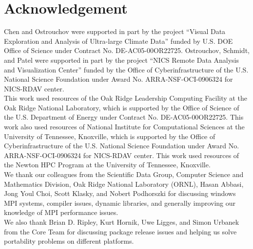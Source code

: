 
\section*{Acknowledgement}

Chen and Ostrouchov were supported in part by the project
``Visual Data Exploration and Analysis of Ultra-large Climate Data''
funded by U.S. DOE Office of Science
under Contract No. DE-AC05-00OR22725.
Ostrouchov, Schmidt, and Patel were supported in part by the project
``NICS Remote Data Analysis and Visualization Center''
funded by the Office of Cyberinfrastructure of the
U.S. National Science Foundation
under Award No. ARRA-NSF-OCI-0906324 for NICS-RDAV center.
\\

This work used resources of the Oak Ridge Leadership Computing Facility at the
Oak Ridge National Laboratory, which is supported by the Office of Science
of the U.S. Department of Energy under Contract No. DE-AC05-00OR22725.
This work also used resources of National Institute for Computational
Sciences at the University of Tennessee, Knoxville, which is supported
by the Office of Cyberinfrastructure of the U.S. National Science Foundation
under Award No. ARRA-NSF-OCI-0906324 for NICS-RDAV center.
This work used resources of the Newton HPC Program at the University of
Tennessee, Knoxville.
\\

We thank our colleagues from the Scientific Data Group, Computer
Science and Mathematics Division, Oak Ridge National Laboratory
(ORNL), Hasan Abbasi, Jong Youl Choi, Scott Klasky, and Nobert
Podhorszki for discussing windows MPI systems, compiler issues,
dynamic libraries, and generally improving our knowledge of MPI
performance issues.
\\

We also thank Brian D. Ripley, Kurt Hornik, Uwe Ligges, and Simon Urbanek
from the  Core Team for discussing package release issues and
helping us solve portability problems on different platforms.
\\
